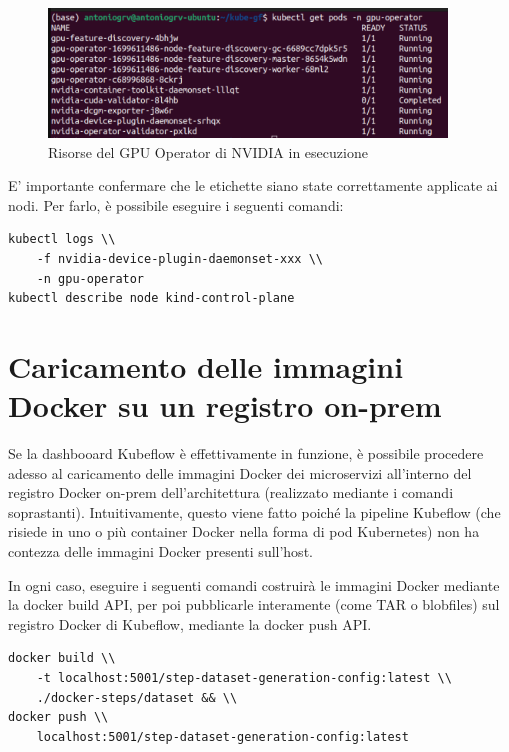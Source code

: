\begin{figure}[h]
    \centering
    \includegraphics[width=400px]{figures/ch4and5/gpu.png}
    \caption[Risorse del GPU Operator di NVIDIA in esecuzione]{Risorse del GPU Operator di NVIDIA in esecuzione}
    \label{fig:cha6:gpu}
\end{figure}

E' importante confermare che le etichette siano state correttamente applicate ai nodi. Per farlo, è possibile eseguire i seguenti comandi:

\begin{small}
\begin{Verbatim}[commandchars=\\\{\}]
kubectl logs \\
    -f nvidia-device-plugin-daemonset-xxx \\
    -n gpu-operator
kubectl describe node kind-control-plane
\end{Verbatim}
\end{small}

\section{Caricamento delle immagini Docker su un registro on-prem}

Se la dashbooard Kubeflow è effettivamente in funzione, è possibile procedere adesso al caricamento delle immagini Docker dei microservizi all'interno del registro Docker on-prem dell'architettura (realizzato mediante i comandi soprastanti). Intuitivamente, questo viene fatto poiché la pipeline Kubeflow (che risiede in uno o più container Docker nella forma di pod Kubernetes) non ha contezza delle immagini Docker presenti sull'host.

In ogni caso, eseguire i seguenti comandi costruirà le immagini Docker mediante la docker build API, per poi pubblicarle interamente (come TAR o blobfiles) sul registro Docker di Kubeflow, mediante la docker push API.

\begin{small}
\begin{Verbatim}[commandchars=\\\{\}]
docker build \\
    -t localhost:5001/step-dataset-generation-config:latest \\
    ./docker-steps/dataset && \\
docker push \\
    localhost:5001/step-dataset-generation-config:latest
\end{Verbatim}
\end{small}

